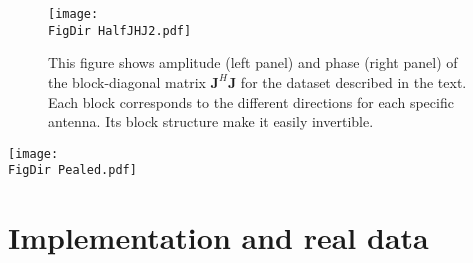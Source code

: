 \documentclass[useAMS,usenatbib]{mn2e}
\newcommand{\JVg}{\bm{J}}
\newcommand{\FigDir}{../Figures/}
\newcommand{\COH}{{\sc CohJones}}
\newcommand{\StefCal}{{\sc StefCal}}
\begin{document}
\begin{figure}
\begin{center}
\texttt{[image: \\FigDir HalfJHJ2.pdf]}
\caption{\label{fig:HalfJHJ} This figure shows amplitude (left panel)
  and phase (right panel) of the block-diagonal matrix $\JVg^H\JVg$
  for the dataset described in the text. Each block corresponds to the
different directions for each specific antenna. Its block structure
make it easily invertible.}
\end{center}
\end{figure}

\begin{figure*}
\begin{center}
\texttt{[image: \\FigDir Pealed.pdf]}
\caption{\label{fig:resid} This figure shows the comparison between
  the deconvoled image
  (left), the residuals data after simple skymodel subtractions
  (center), and the residuals data after subtracting the
  sky model corrupted by the direction-dependent \COH~estimated solution
  (right). The color scale is the same in all panels. In this
  simulation, \COH~reduces the
residual data level by a factor of $\sim30$.}
\end{center}
\end{figure*}

\section{Implementation and real data}





\end{document}
